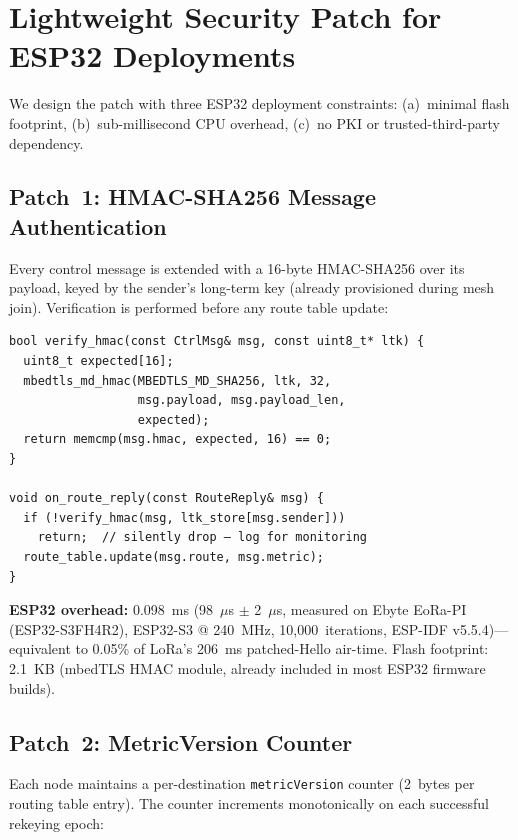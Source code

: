 \documentclass[10pt,journal,compsoc]{IEEEtran}
\begin{document}
\section{Lightweight Security Patch for ESP32 Deployments}
\label{sec:patch}

We design the patch with three ESP32 deployment constraints:
(a)~minimal flash footprint, (b)~sub-millisecond CPU overhead,
(c)~no PKI or trusted-third-party dependency.

\subsection{Patch~1: HMAC-SHA256 Message Authentication}

Every control message is extended with a 16-byte HMAC-SHA256
over its payload, keyed by the sender's long-term key
(already provisioned during mesh join). Verification is performed
before any route table update:

\begin{lstlisting}[caption={route.cpp — HMAC verification (23 lines)}]
bool verify_hmac(const CtrlMsg& msg, const uint8_t* ltk) {
  uint8_t expected[16];
  mbedtls_md_hmac(MBEDTLS_MD_SHA256, ltk, 32,
                  msg.payload, msg.payload_len,
                  expected);
  return memcmp(msg.hmac, expected, 16) == 0;
}

void on_route_reply(const RouteReply& msg) {
  if (!verify_hmac(msg, ltk_store[msg.sender]))
    return;  // silently drop — log for monitoring
  route_table.update(msg.route, msg.metric);
}
\end{lstlisting}

\textbf{ESP32 overhead:} 0.098~ms (98~$\mu$s $\pm$ 2~$\mu$s,
measured on Ebyte EoRa-PI (ESP32-S3FH4R2), ESP32-S3 @ 240~MHz,
10,000~iterations, ESP-IDF v5.5.4)—equivalent to
0.05\% of LoRa's 206~ms patched-Hello air-time. Flash footprint: 2.1~KB (mbedTLS
HMAC module, already included in most ESP32 firmware builds).

\subsection{Patch~2: MetricVersion Counter}

Each node maintains a per-destination \texttt{metricVersion}
counter (2~bytes per routing table entry). The counter increments
monotonically on each successful rekeying epoch:
\end{document}
